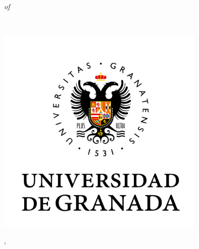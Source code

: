 \begin{titlepage}
    \begin{addmargin}[-1cm]{-3cm}
    \begin{center}
        \large

        \hfill

        \vfill 

        \begingroup
            {\color{Maroon}}

            \small{\emph{of}}
            \bigskip
        	
            {\color{Maroon}\spacedallcaps{\myTitle}}

			\small\mySubtitle \medskip  \medskip
            \\ \bigskip
        \endgroup

        \spacedlowsmallcaps{\myName}

        \vfill



		\includegraphics[trim={0 5cm 0 0},clip,width=10cm]{gfx/logo_ugr_new}
	

        \vfill

        \myProf, \myOtherProf \\
        \myUni \\ \bigskip

        \myTime\ %


    \end{center}
  \end{addmargin}
\end{titlepage}
